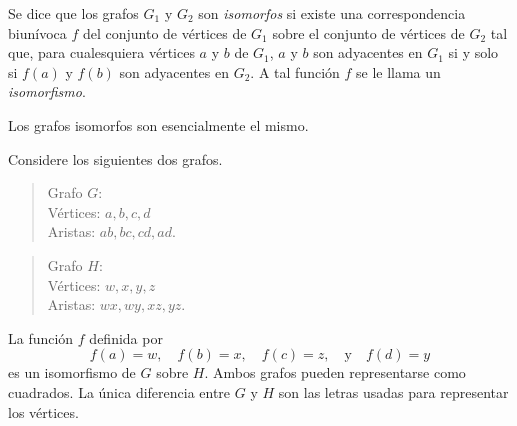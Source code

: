 \documentclass[12pt,a4paper]{book}
\begin{document}
    \begin{definicion}\label{def:isomorfismo-grafos}
        Se dice que los grafos $G_{1}$ y $G_{2}$ son \textit{isomorfos} si existe una correspondencia biunívoca $f$ del
        conjunto de vértices de $G_{1}$ sobre el conjunto de vértices de $G_{2}$ tal que, para cualesquiera vértices $a$ y
        $b$ de $G_{1}$, $a$ y $b$ son adyacentes en $G_{1}$ si y solo si $f(a)$ y $f(b)$ son adyacentes en $G_{2}$. A tal
        función $f$ se le llama un \textit{isomorfismo}.
    \end{definicion}

    Los grafos isomorfos son esencialmente el mismo.

    \begin{ejemplo}\label{ej:grafos-isomorfos}
        Considere los siguientes dos grafos.

        \begin{quote}
            Grafo $G$:\\
            Vértices: $a,b,c,d$\\
            Aristas: $ab,bc,cd,ad$.
        \end{quote}

        \begin{quote}
            Grafo $H$:\\
            Vértices: $w,x,y,z$\\
            Aristas: $wx,wy,xz,yz$.
        \end{quote}

        La función $f$ definida por
        \begin{equation*}
            f(a)=w,\quad f(b)=x,\quad f(c)=z,\quad\text{y}\quad f(d)=y
        \end{equation*}
        es un isomorfismo de $G$ sobre $H$. Ambos grafos pueden representarse como cuadrados. La única diferencia entre
        $G$ y $H$ son las letras usadas para representar los vértices.
    \end{ejemplo}
\end{document}
